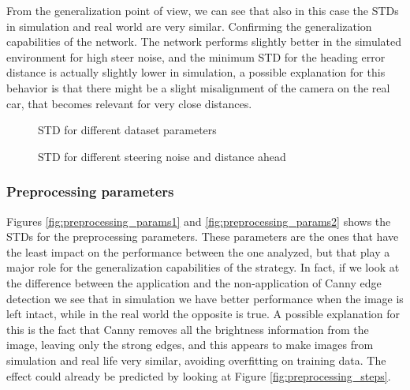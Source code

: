 \documentclass[a4paper,12pt,sort&compress]{article}
\begin{document}
    From the generalization point of view, we can see that also in this case the STDs in simulation
    and real world are very similar. Confirming the generalization capabilities of the network. The
    network performs slightly better in the simulated environment for high steer noise, and the
    minimum STD for the heading error distance is actually slightly lower in simulation, a possible
    explanation for this behavior is that there might be a slight misalignment of the camera on the
    real car, that becomes relevant for very close distances.

    \begin{figure}
        \centering
        \begin{subfigure}[b]{\textwidth}
            \centering
        \end{subfigure}
        \begin{subfigure}[b]{\textwidth}
            \centering
        \end{subfigure}
        \caption{STD for different dataset parameters}
        \label{fig:ds_parameters}
    \end{figure}

    \begin{figure}
        \centering
        \caption{STD for different steering noise and distance ahead}
        \label{fig:3d_noise_dist}
    \end{figure}

\clearpage

\subsubsection*{Preprocessing parameters}
    Figures \ref{fig:preprocessing_params1} and \ref{fig:preprocessing_params2} shows the STDs for
    the preprocessing parameters.
    These parameters are the ones that have the least impact on the performance between
    the one analyzed, but that play a major role for the generalization capabilities of the
    strategy. In fact, if we look at the difference between the application and the non-application of Canny edge detection
    we see that in simulation we have better performance when the image is left intact,
    while in the real world the opposite is true. A possible explanation for this is the fact that
    Canny removes all the brightness information from the image, leaving only the strong edges, and
    this appears to make images from simulation and real life very similar, avoiding overfitting on
    training data.
    The effect could already be predicted by looking at Figure \ref{fig:preprocessing_steps}.
    
\end{document}
